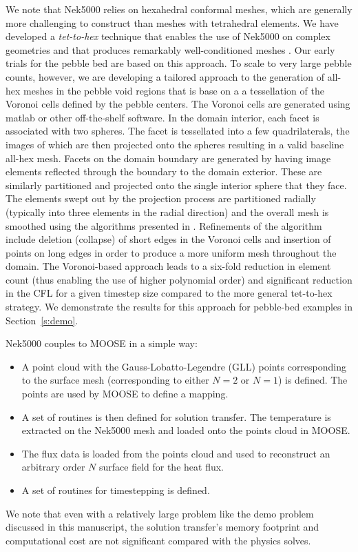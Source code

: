 We note that Nek5000 relies on hexahedral conformal meshes, which are generally
more challenging to construct than meshes with tetrahedral elements.  We have
developed a \textit{tet-to-hex} technique that enables the use of Nek5000 on
complex geometries and that produces remarkably well-conditioned meshes
\cite{yuan2020spectral}.  Our early trials for the pebble bed are based on this
approach.  To scale to very large pebble counts, however, we are developing a
tailored approach to the generation of all-hex meshes in the pebble void regions
that is base on a a tessellation of the Voronoi cells defined by the pebble
centers.  The Voronoi cells are generated using matlab or other off-the-shelf
software.  In the domain interior, each facet is associated with two spheres.
The facet is tessellated into a few quadrilaterals, the images of which are
then projected onto the spheres resulting in a valid baseline all-hex mesh.
Facets on the domain boundary are generated by having image elements reflected
through the boundary to the domain exterior.  These are similarly partitioned
and projected onto the single interior sphere that they face.  The elements
swept out by the projection process are partitioned radially (typically into
three elements in the radial direction) and the overall mesh is smoothed using
the algorithms presented in \cite{mittal19a}.  Refinements of the algorithm
include deletion (collapse) of short edges in the Voronoi cells and insertion
of points on long edges in order to produce a more uniform mesh throughout the
domain.  The Voronoi-based approach leads to a six-fold reduction in element
count (thus enabling the use of higher polynomial order) and significant
reduction in the CFL for a given timestep size compared to the more general
tet-to-hex strategy.  We demonstrate the results for this approach for
pebble-bed examples in Section~\ref{s:demo}.

Nek5000 couples to MOOSE in a simple way:
\begin{itemize}
 \item A point cloud with the Gauss-Lobatto-Legendre (GLL) points corresponding to the surface mesh
      (corresponding to either $N = 2$ or $N = 1$) is defined. The points are
      used by MOOSE to define a mapping.
 \item A set of routines is then defined for solution transfer. The temperature
      is extracted on the Nek5000 mesh and loaded onto the points cloud in MOOSE.
 \item The flux data is loaded from the points cloud and used to reconstruct
      an arbitrary order $N$ surface field for the heat flux.
 \item A set of routines for timestepping is defined.
\end{itemize}
We note that even with a relatively large problem like the demo problem
discussed in this manuscript, the solution transfer's memory footprint and
computational cost are not significant compared with the physics solves.

